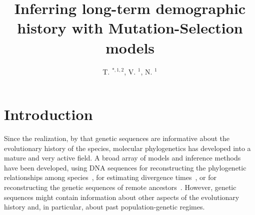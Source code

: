 \documentclass{MBE}
\begin{document}
	\title[Inferring long-term population size] {Inferring long-term demographic history with Mutation-Selection models}


	\author[Latrille et al.] {T. $^{\ast,1,2}$, V. $^{1}$, N. $^{1}$}

	\address{
	$^{1}$Universite de Lyon, Universite Lyon 1, CNRS, Laboratoire de Biometrie et Biologie Evolutive UMR 5558, F-69622 Villeurbanne, France.\\
	$^{2}$Ecole Normale Superieure de Lyon, Universite de Lyon, Universite Lyon 1, Lyon, France}







	\maketitle

	\section{Introduction}
	\label{sec:Introduction}

	Since the realization, by \citet{Zuckerkandl1965} that genetic sequences are informative about the evolutionary history of the species, molecular phylogenetics has developed into a mature and very active field.
	A broad array of models and inference methods have been developed, using {DNA} sequences for reconstructing the phylogenetic relationships among species~\citep{Felsenstein1981}, for estimating divergence times~\citep{Thorne2002}, or for reconstructing the genetic sequences of remote ancestors~\citep{Liberles2007}.
	However, genetic sequences might contain information about other aspects of the evolutionary history and, in particular, about past population-genetic regimes.
\end{document}
